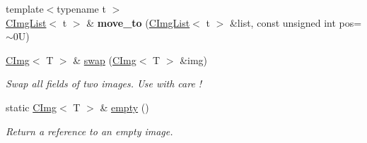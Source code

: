 \begin{DoxyCompactItemize}
\item 
\hypertarget{structcimg__library_1_1CImg_a2c8b8e65025e00bde3ddec18eb539079}{
{\footnotesize template$<$typename t $>$ }\\\hyperlink{structcimg__library_1_1CImgList}{CImgList}$<$ t $>$ \& {\bfseries move\_\-to} (\hyperlink{structcimg__library_1_1CImgList}{CImgList}$<$ t $>$ \&list, const unsigned int pos=$\sim$0U)}
\label{structcimg__library_1_1CImg_a2c8b8e65025e00bde3ddec18eb539079}

\item 
\hypertarget{structcimg__library_1_1CImg_a4e00c35b15007593513f64c7ee7fb7f7}{
\hyperlink{structcimg__library_1_1CImg}{CImg}$<$ T $>$ \& \hyperlink{structcimg__library_1_1CImg_a4e00c35b15007593513f64c7ee7fb7f7}{swap} (\hyperlink{structcimg__library_1_1CImg}{CImg}$<$ T $>$ \&img)}
\label{structcimg__library_1_1CImg_a4e00c35b15007593513f64c7ee7fb7f7}

\begin{DoxyCompactList}\small\item\em Swap all fields of two images. Use with care ! \item\end{DoxyCompactList}\item 
\hypertarget{structcimg__library_1_1CImg_a1b313d26863cbcde8a5bcb43610e9edc}{
static \hyperlink{structcimg__library_1_1CImg}{CImg}$<$ T $>$ \& \hyperlink{structcimg__library_1_1CImg_a1b313d26863cbcde8a5bcb43610e9edc}{empty} ()}
\label{structcimg__library_1_1CImg_a1b313d26863cbcde8a5bcb43610e9edc}

\begin{DoxyCompactList}\small\item\em Return a reference to an empty image. \item\end{DoxyCompactList}\end{DoxyCompactItemize}

